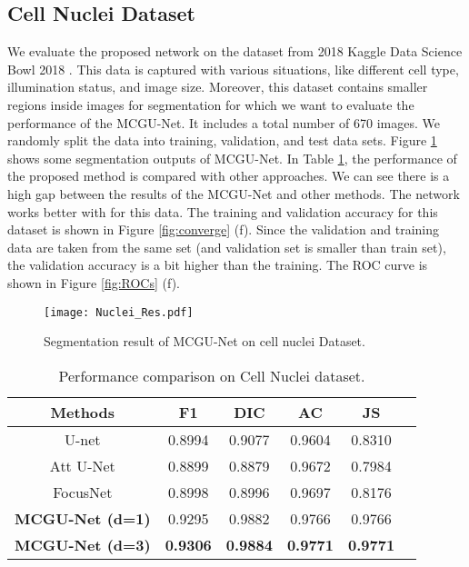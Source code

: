 \documentclass[journal]{IEEEtran}
\begin{document}
\subsection{Cell Nuclei Dataset}
We evaluate the proposed network on the dataset from 2018 Kaggle Data Science Bowl 2018 \cite{bowl2018}. This data is captured with various situations, like different cell type, illumination status, and image size. Moreover, this dataset contains smaller regions inside images for segmentation for which we want to evaluate the performance of the MCGU-Net. It includes a total number of 670 images. We randomly split the data into  training,  validation, and  test data sets.
Figure \ref{fig:Nuclei_R} shows some segmentation outputs of MCGU-Net. In Table \ref{tab:Nuclei}, the performance of the proposed method is compared with other approaches. We can see there is a high gap between the results of the MCGU-Net and other methods. The network works better with  for this data. The training and validation accuracy for this dataset is shown in Figure \ref{fig:converge} (f). Since the validation and training data are taken from the same set (and validation set is smaller than train set), the validation accuracy is a bit higher than the training. The ROC curve is shown in Figure \ref{fig:ROCs} (f).
 
 
 \begin{figure}
 \centering
 \texttt{[image: Nuclei\_Res.pdf]}
 \caption{Segmentation result of MCGU-Net on cell nuclei Dataset.} 
 \vspace*{-0.5\baselineskip}
 \label{fig:Nuclei_R}
 \end{figure}
 




\begin{table}
\centering
    \vspace*{-\baselineskip}
\caption{Performance comparison on Cell Nuclei dataset.}
	\begin{tabular}{cccccc}
		\hline
		\textbf{Methods} & \textbf{F1}&	\textbf{DIC}&	\textbf{AC}&	\textbf{JS}\\
		\hline
		U-net  \cite{ronneberger2015}  &  0.8994 & 0.9077 & 0.9604  & 0.8310  \\
	    Att U-Net \cite{oktay2018} & 0.8899    & 0.8879 & 	0.9672 &	0.7984 \\
		FocusNet \cite{kaul2019focusnet} & 0.8998 &	 0.8996 &	0.9697 &	0.8176   \\
	    \hline
		\textbf{MCGU-Net (d=1)}& 0.9295  &  0.9882 & 0.9766 &	 0.9766\\
		\textbf{MCGU-Net (d=3)}& \textbf{0.9306} & \textbf{0.9884}& \textbf{0.9771 }& \textbf{ 0.9771}\\
		\hline
	\end{tabular}
	\label{tab:Nuclei}
\end{table}
\end{document}
